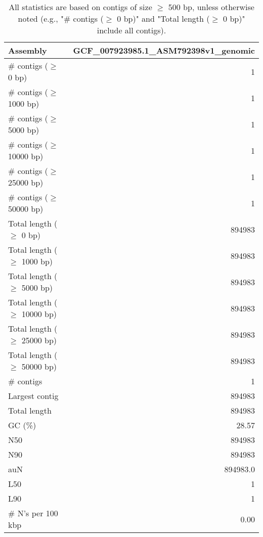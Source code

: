 \documentclass[12pt,a4paper]{article}
\begin{document}
\begin{table}[ht]
\begin{center}
\caption{All statistics are based on contigs of size $\geq$ 500 bp, unless otherwise noted (e.g., "\# contigs ($\geq$ 0 bp)" and "Total length ($\geq$ 0 bp)" include all contigs).}
\begin{tabular}{|l*{1}{|r}|}
\hline
Assembly & GCF\_007923985.1\_ASM792398v1\_genomic \\ \hline
\# contigs ($\geq$ 0 bp) & 1 \\ \hline
\# contigs ($\geq$ 1000 bp) & 1 \\ \hline
\# contigs ($\geq$ 5000 bp) & 1 \\ \hline
\# contigs ($\geq$ 10000 bp) & 1 \\ \hline
\# contigs ($\geq$ 25000 bp) & 1 \\ \hline
\# contigs ($\geq$ 50000 bp) & 1 \\ \hline
Total length ($\geq$ 0 bp) & 894983 \\ \hline
Total length ($\geq$ 1000 bp) & 894983 \\ \hline
Total length ($\geq$ 5000 bp) & 894983 \\ \hline
Total length ($\geq$ 10000 bp) & 894983 \\ \hline
Total length ($\geq$ 25000 bp) & 894983 \\ \hline
Total length ($\geq$ 50000 bp) & 894983 \\ \hline
\# contigs & 1 \\ \hline
Largest contig & 894983 \\ \hline
Total length & 894983 \\ \hline
GC (\%) & 28.57 \\ \hline
N50 & 894983 \\ \hline
N90 & 894983 \\ \hline
auN & 894983.0 \\ \hline
L50 & 1 \\ \hline
L90 & 1 \\ \hline
\# N's per 100 kbp & 0.00 \\ \hline
\end{tabular}
\end{center}
\end{table}
\end{document}
